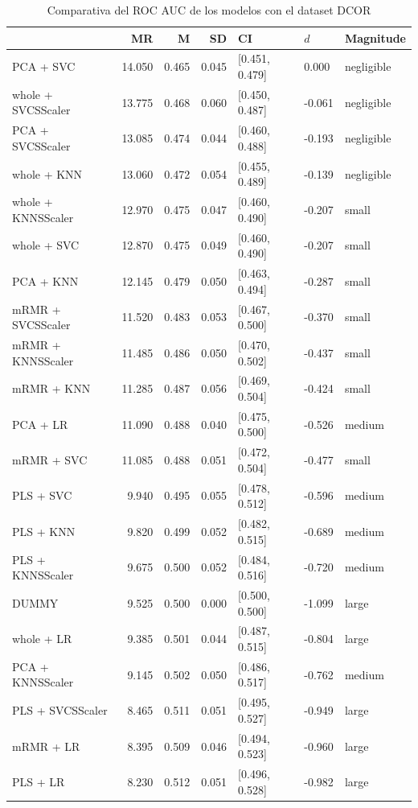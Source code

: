 \documentclass[a4paper,oneside,11pt,leqno]{article}
\begin{document}
	\begin{table}[h]
		\centering
		\begin{tabular}{lrrrlll}
			\toprule
			{} &     MR &     M &    SD &              CI &    $d$ &   Magnitude \\
			\midrule
			PCA + SVC          & 14.050 & 0.465 & 0.045 &  [0.451, 0.479] &  0.000 &  negligible \\
			whole + SVCSScaler & 13.775 & 0.468 & 0.060 &  [0.450, 0.487] & -0.061 &  negligible \\
			PCA + SVCSScaler   & 13.085 & 0.474 & 0.044 &  [0.460, 0.488] & -0.193 &  negligible \\
			whole + KNN        & 13.060 & 0.472 & 0.054 &  [0.455, 0.489] & -0.139 &  negligible \\
			whole + KNNSScaler & 12.970 & 0.475 & 0.047 &  [0.460, 0.490] & -0.207 &       small \\
			whole + SVC        & 12.870 & 0.475 & 0.049 &  [0.460, 0.490] & -0.207 &       small \\
			PCA + KNN          & 12.145 & 0.479 & 0.050 &  [0.463, 0.494] & -0.287 &       small \\
			mRMR + SVCSScaler  & 11.520 & 0.483 & 0.053 &  [0.467, 0.500] & -0.370 &       small \\
			mRMR + KNNSScaler  & 11.485 & 0.486 & 0.050 &  [0.470, 0.502] & -0.437 &       small \\
			mRMR + KNN         & 11.285 & 0.487 & 0.056 &  [0.469, 0.504] & -0.424 &       small \\
			PCA + LR           & 11.090 & 0.488 & 0.040 &  [0.475, 0.500] & -0.526 &      medium \\
			mRMR + SVC         & 11.085 & 0.488 & 0.051 &  [0.472, 0.504] & -0.477 &       small \\
			PLS + SVC          &  9.940 & 0.495 & 0.055 &  [0.478, 0.512] & -0.596 &      medium \\
			PLS + KNN          &  9.820 & 0.499 & 0.052 &  [0.482, 0.515] & -0.689 &      medium \\
			PLS + KNNSScaler   &  9.675 & 0.500 & 0.052 &  [0.484, 0.516] & -0.720 &      medium \\
			DUMMY              &  9.525 & 0.500 & 0.000 &  [0.500, 0.500] & -1.099 &       large \\
			whole + LR         &  9.385 & 0.501 & 0.044 &  [0.487, 0.515] & -0.804 &       large \\
			PCA + KNNSScaler   &  9.145 & 0.502 & 0.050 &  [0.486, 0.517] & -0.762 &      medium \\
			PLS + SVCSScaler   &  8.465 & 0.511 & 0.051 &  [0.495, 0.527] & -0.949 &       large \\
			mRMR + LR          &  8.395 & 0.509 & 0.046 &  [0.494, 0.523] & -0.960 &       large \\
			PLS + LR           &  8.230 & 0.512 & 0.051 &  [0.496, 0.528] & -0.982 &       large \\
			\bottomrule
		\end{tabular}
		\caption{Comparativa del ROC AUC de los modelos con el dataset DCOR}
		\label{tab:stat_results_dcor}
	\end{table}
\end{document}
